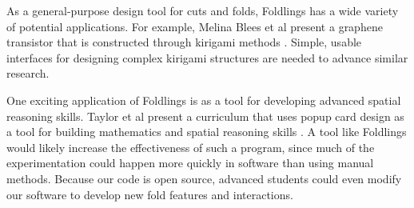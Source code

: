 As a general-purpose design tool for cuts and folds, Foldlings has a
wide variety of potential applications. For example, Melina Blees et al
present a graphene transistor that is constructed through kirigami
methods \citet{blees2014graphene}. Simple, usable interfaces for
designing complex kirigami structures are needed to advance similar
research.

One exciting application of Foldlings is as a tool for developing
advanced spatial reasoning skills. Taylor et al present a curriculum
that uses popup card design as a tool for building mathematics and
spatial reasoning skills \citet{taylor2013think3d}
\citet{olson_mathematics_2004}. A tool like Foldlings would likely
increase the effectiveness of such a program, since much of the
experimentation could happen more quickly in software than using manual
methods. Because our code is open source, advanced students could even
modify our software to develop new fold features and interactions.
